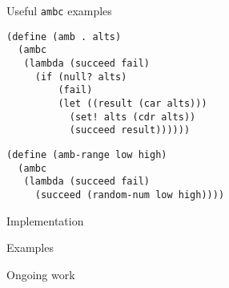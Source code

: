 \documentclass[14pt]{beamer}
\begin{document}
\begin{frame}[fragile]{Useful \texttt{ambc} examples}
  \begin{lstlisting}
(define (amb . alts)
  (ambc
   (lambda (succeed fail)
     (if (null? alts)
         (fail)
         (let ((result (car alts)))
           (set! alts (cdr alts))
           (succeed result))))))
  \end{lstlisting}
\pause
  \begin{lstlisting}
(define (amb-range low high)
  (ambc
   (lambda (succeed fail)
     (succeed (random-num low high))))
  \end{lstlisting}
\end{frame}

\begin{frame}{Implementation}
  
\end{frame}

\begin{frame}{Examples}
  
\end{frame}

\begin{frame}{Ongoing work}
  
\end{frame}
\end{document}
